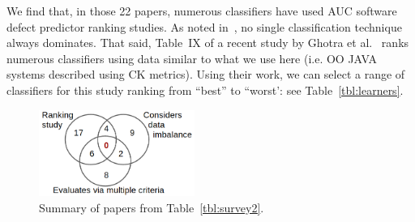 \documentclass[10pt,conference]{IEEEtran}
\theoremstyle{break}
\theoremstyle{break}
\newcommand{\sma}{{\sc SMOTE}}
\newcommand{\smb}{{\sc SMOTUNED}}
\begin{document}
We find that, in those 22 papers,
numerous classifiers have used AUC software defect
predictor ranking studies.  
As
 noted in~\cite{lessmann2008benchmarking, ghotra2015revisiting},  no single classification technique always dominates.  
 That said, Table~IX of a recent study by Ghotra et al.~\cite{ghotra2015revisiting}
 ranks numerous classifiers  using data similar
 to what we use here (i.e. OO JAVA systems described using CK metrics).
 Using their work, we can select
 a range of classifiers  for this study
 ranking from ``best''
 to ``worst': see Table~\ref{tbl:learners}.
 
 \begin{figure}[!htbp]
\begin{center}
\includegraphics[width=2in]{venn.png}
\end{center}
\caption{Summary of papers from Table~\ref{tbl:survey2}.}
\label{fig:s2}
\vspace{-0.6cm}
\end{figure}
 


\end{document}
